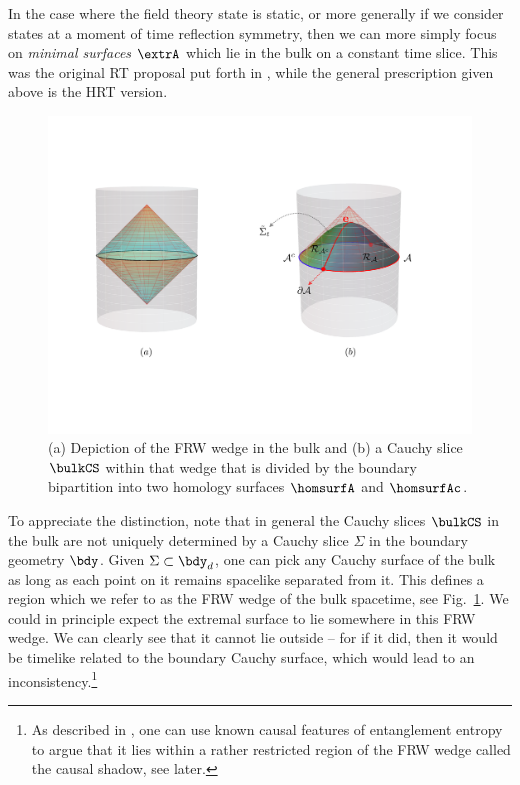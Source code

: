 \documentclass[12pt,openany]{book}
\begin{document}
In the case where the field theory state is static, or more generally if we consider states at a moment of time reflection symmetry,  then we can more simply focus on \emph{minimal surfaces} $\extrA$ which lie in the bulk on a constant time slice. This was the original RT proposal put forth in \cite{Ryu:2006ef}, while the general prescription given above is the HRT version.


\begin{figure}[htbp]
\begin{center}
\includegraphics[width=4.5in]{figures/frwbulk}
\caption{(a) Depiction of the FRW wedge in the bulk and (b) a Cauchy slice $\bulkCS$ within that wedge that is divided by the boundary bipartition into two homology surfaces $\homsurfA$ and $\homsurfAc$.
}
\label{f:bulkfrw}
\end{center}
\end{figure}
%

To appreciate the distinction, note that in general the Cauchy slices  $\bulkCS $ in the bulk are not uniquely determined by a Cauchy slice $\Sigma$ in the boundary geometry $\bdy$. Given $\Sigma\subset \bdy_d$, one can pick any Cauchy surface of the bulk as long as each point on it remains spacelike separated from it. This defines a region which we refer to as the FRW wedge of the bulk spacetime, see Fig.~\ref{f:bulkfrw}. We could in principle expect the extremal surface to lie somewhere in this FRW wedge. We can clearly see that  it cannot lie outside -- for if it did, then it would be timelike related to the boundary Cauchy surface, which would lead to an inconsistency.\footnote{ As described in \cite{Headrick:2014cta}, one can use known causal features of entanglement entropy to argue that it lies within a rather restricted region of the FRW wedge called the causal shadow, see later.}
\end{document}
